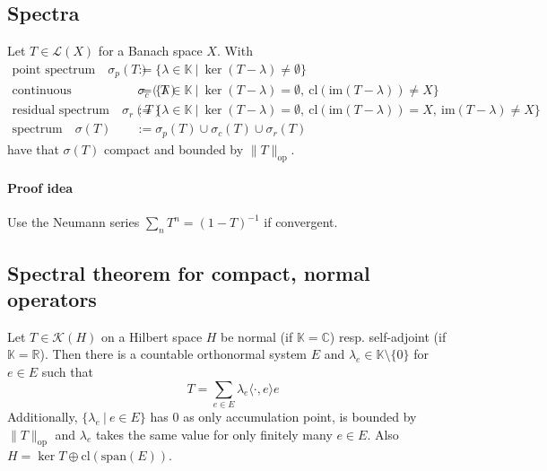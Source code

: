 \documentclass{scrartcl}
\newcommand{\R}{\mathbb{R}}
\newcommand{\C}{\mathbb{C}}
\begin{document}
\subsection{Spectra}
Let $T \in \mathcal{L}(X)$ for a Banach space $X$.
With
\begin{align*}
    \text{point spectrum} \quad \sigma_p(T) &:= \{ \lambda \in \mathbb{K} \ | \ \ker(T - \lambda) \neq \emptyset \} \\
    \text{continuous spectrum} \quad \sigma_c(T) &:= \{ \lambda \in \mathbb{K} \ | \ \ker(T - \lambda) = \emptyset, \ \mathrm{cl}(\mathrm{im}(T - \lambda)) \neq X \} \\
    \text{residual spectrum} \quad \sigma_r(T) &:= \{ \lambda \in \mathbb{K} \ | \ \ker(T - \lambda) = \emptyset, \ \mathrm{cl}(\mathrm{im}(T - \lambda)) = X, \ \mathrm{im}(T - \lambda) \neq X \} \\
    \text{spectrum} \quad \sigma(T) &:= \sigma_p(T) \cup \sigma_c(T) \cup \sigma_r(T)
\end{align*}
have that $\sigma(T)$ compact and bounded by $\| T \|_{\mathrm{op}}$.
\paragraph{Proof idea} Use the Neumann series $\sum_n T^n = (1 - T)^{-1}$ if convergent.

\subsection{Spectral theorem for compact, normal operators}
\label{spectral_theorem_operator}
Let $T \in \mathcal{K}(H)$ on a Hilbert space $H$ be normal (if $\mathbb{K} = \C$) resp. self-adjoint (if $\mathbb{K} = \R$). Then there is a countable orthonormal system $E$ and $\lambda_e \in \mathbb{K} \setminus \{0\}$ for $e \in E$ such that
\begin{equation*}
    T = \sum_{e \in E} \lambda_e \langle \cdot, e \rangle e
\end{equation*}
Additionally, $\{ \lambda_e \ | \ e \in E \}$ has $0$ as only accumulation point, is bounded by $\| T \|_{\mathrm{op}}$ and $\lambda_e$ takes the same value for only finitely many $e \in E$. Also $H = \ker T \oplus \mathrm{cl}(\mathrm{span}(E))$.
\end{document}

